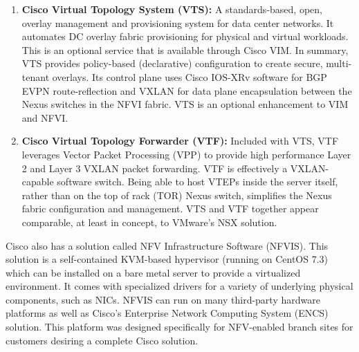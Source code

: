 \begin{enumerate}
  \item \textbf{Cisco Virtual Topology System (VTS):} A standards-based, open,
  overlay management and provisioning system for data center networks. It automates DC
  overlay fabric provisioning for physical and virtual workloads. This is an
  optional service that is available through Cisco VIM\@. In summary, VTS provides
  policy-based (declarative) configuration to create secure, multi-tenant
  overlays. Its control plane uses Cisco IOS-XRv software for BGP EVPN
  route-reflection and VXLAN for data plane encapsulation between the Nexus
  switches in the NFVI fabric. VTS is an optional enhancement to VIM and NFVI\@.
  \item \textbf{Cisco Virtual Topology Forwarder (VTF):} Included with VTS, VTF
  leverages Vector Packet Processing (VPP) to provide high performance Layer 2
  and Layer 3 VXLAN packet forwarding. VTF is effectively a VXLAN-capable
  software switch. Being able to host VTEPs inside the server itself, rather
  than on the top of rack (TOR) Nexus switch, simplifies the Nexus fabric
  configuration and management. VTS and VTF together appear comparable, at least
  in concept, to VMware's NSX solution.
\end{enumerate}

Cisco also has a solution called NFV Infrastructure Software (NFVIS). This
solution is a self-contained KVM-based hypervisor (running on CentOS 7.3)
which can be installed on a bare metal server to provide a virtualized
environment. It comes with specialized drivers for a variety of underlying
physical components, such as NICs. NFVIS can run on many third-party hardware
platforms as well as Cisco's Enterprise Network Computing System (ENCS)
solution. This platform was designed specifically for NFV-enabled branch sites
for customers desiring a complete Cisco solution.

